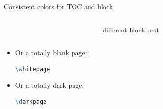 \documentclass[aspectratio=169,11pt]{beamer}
\begin{document}
\startpagenavy
\begin{frame}[noframenumbering]

  \maketitle

\end{frame}
\normalpagewavesnavy
\begin{frame}{\insertsection} {Consistent colors for TOC and block}
    \begin{columns}
        \begin{column}{0.5\textwidth}
            \tableofcontents
        \end{column}
        \begin{column}{0.5\textwidth}
            \begin{block}{different block}
                text 
            \end{block}
        \end{column}
    \end{columns}
\end{frame}


\whitepage
\begin{frame}[fragile]{\insertsection}
    \begin{itemize}
        \item Or a totally blank page:
        \begin{lstlisting}[language=tcl,numbers=none]
\whitepage\end{lstlisting}
    \end{itemize}
\end{frame}

\darkpage
\begin{frame}[fragile]{\insertsection}
    \begin{itemize}
        \item Or a totally dark page:
        \begin{lstlisting}[language=tcl,numbers=none]
\darkpage\end{lstlisting}
    \end{itemize}
\end{frame}


\normalpageline
\end{document}
